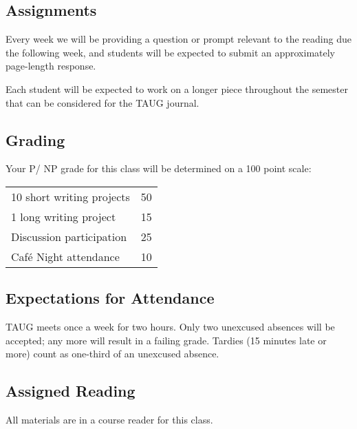\subsection{Assignments}
Every week we will be providing a question or prompt relevant to the reading due the following week, and students will be expected to submit an approximately page-length response.

Each student will be expected to work on a longer piece throughout the semester that can be considered for the TAUG journal.

\subsection{Grading}
Your P/ NP grade for this class will be determined on a 100 point scale:

\begin{center}
	\begin{tabular}{lr}
		10 short writing projects & 50 \\
		1 long writing project & 15 \\
		Discussion participation & 25 \\
		Caf\'e Night attendance & 10
	\end{tabular}
\end{center}

\subsection{Expectations for Attendance}
TAUG meets once a week for two hours. Only two unexcused absences will be accepted; any more will result in a failing grade. Tardies (15 minutes late or more) count as one-third of an unexcused absence.

\subsection{Assigned Reading}
All materials are in a course reader for this class.
